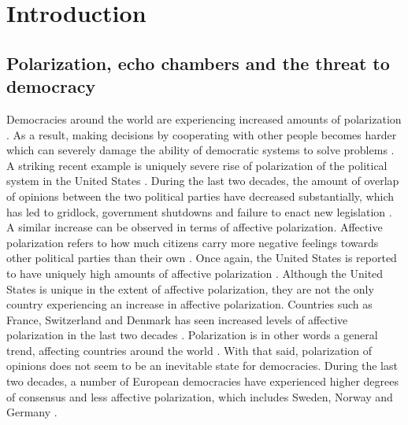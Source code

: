 \documentclass{article}
\begin{document}
\newpage
\tableofcontents
\newpage

\section{Introduction}

\subsection{Polarization, echo chambers and the threat to democracy}

Democracies around the world are experiencing increased amounts of polarization \cite{boxell_cross-country_2020,mccoy_polarization_2018, somer_deja_2018}. 
As a result, making decisions by cooperating with other people becomes harder which can severely damage the ability of democratic systems to solve problems \cite{andris_rise_2015,levin_dynamics_2021,mccoy_polarization_2018}. 
A striking recent example is uniquely severe rise of polarization of the political system in the United States \cite{dimock_america_2020}. 
During the last two decades, the amount of overlap of opinions between the two political parties have decreased substantially, which has led to gridlock, government shutdowns and failure to enact new legislation \cite{andris_rise_2015, pew_research_center_political_2014-1}. 
A similar increase can be observed in terms of affective polarization. Affective polarization refers to how much citizens carry more negative feelings towards other political parties than their own \cite{boxell_cross-country_2020, iyengar_origins_2019}. 
Once again, the United States is reported to have uniquely high amounts of affective polarization \cite{boxell_cross-country_2020}. 
Although the United States is unique in the extent of affective polarization, they are not the only country experiencing an increase in affective polarization. 
Countries such as France, Switzerland and Denmark has seen increased levels of affective polarization in the last two decades \cite{boxell_cross-country_2020}. 
Polarization is in other words a general trend, affecting countries around the world \cite{mccoy_polarization_2018, somer_deja_2018, wilson_polarization_2020}. 
With that said, polarization of opinions does not seem to be an inevitable state for democracies. 
During the last two decades, a number of European democracies have experienced higher degrees of consensus and less affective polarization, which includes Sweden, Norway and Germany \cite{boxell_cross-country_2020}. 
\end{document}
